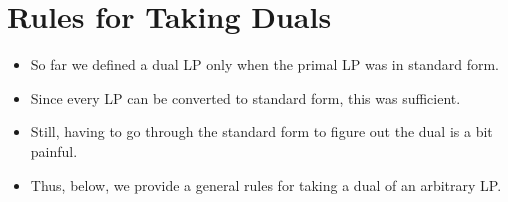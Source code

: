 \documentclass{article}
\begin{document}
\section{Rules for Taking Duals}

\begin{itemize}
\item So far we defined a dual LP only when the primal LP was in standard form. 
\item Since every LP can be converted to standard form, this was sufficient.
\item  Still, having to go through the standard form to figure out the dual is a bit painful. \item Thus, below, we provide a general rules for taking a dual of an arbitrary LP. 
\end{itemize}
\end{document}
